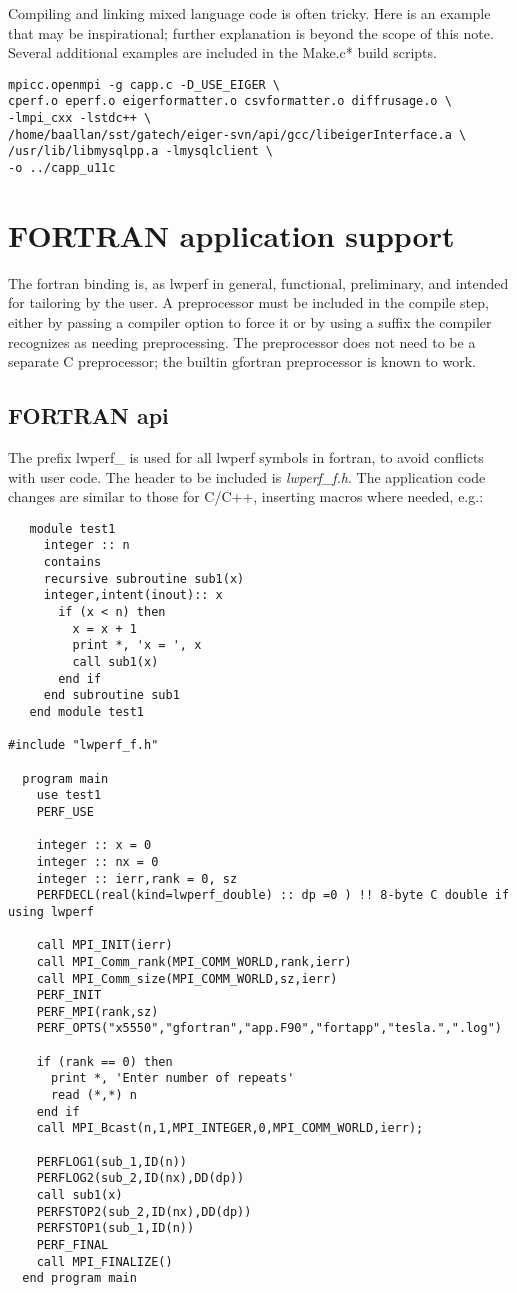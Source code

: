 \documentclass{article}
\begin{document}
Compiling and linking mixed language code is often tricky. Here is an example that may be inspirational; further explanation is beyond the scope of this note. Several additional examples are included in the Make.c* build scripts.
\begin{verbatim}
mpicc.openmpi -g capp.c -D_USE_EIGER \
cperf.o eperf.o eigerformatter.o csvformatter.o diffrusage.o \
-lmpi_cxx -lstdc++ \
/home/baallan/sst/gatech/eiger-svn/api/gcc/libeigerInterface.a \
/usr/lib/libmysqlpp.a -lmysqlclient \
-o ../capp_u11c
\end{verbatim}

\section{FORTRAN application support}
\label{sec:fortran}
The fortran binding is, as lwperf in general, functional, preliminary, and intended for tailoring by the user.  A preprocessor must be included in the compile step, either by passing a compiler option to force it or by using a suffix the compiler recognizes as needing preprocessing. The preprocessor does not need to be a separate C preprocessor; the builtin gfortran preprocessor is known to work.

\subsection{FORTRAN api}
\label{sec:fapi}
The prefix lwperf\_ is used for all lwperf symbols in fortran, to avoid conflicts with user code. The header to be included is {\em lwperf\_f.h}. 
The application code changes are similar to those for C/C++, inserting macros where needed, e.g.:
\begin{verbatim}
   module test1
     integer :: n
     contains
     recursive subroutine sub1(x)
     integer,intent(inout):: x
       if (x < n) then
         x = x + 1
         print *, 'x = ', x
         call sub1(x)
       end if
     end subroutine sub1
   end module test1

#include "lwperf_f.h"

  program main
    use test1
    PERF_USE

    integer :: x = 0
    integer :: nx = 0
    integer :: ierr,rank = 0, sz
    PERFDECL(real(kind=lwperf_double) :: dp =0 ) !! 8-byte C double if using lwperf

    call MPI_INIT(ierr)
    call MPI_Comm_rank(MPI_COMM_WORLD,rank,ierr)
    call MPI_Comm_size(MPI_COMM_WORLD,sz,ierr)
    PERF_INIT
    PERF_MPI(rank,sz)
    PERF_OPTS("x5550","gfortran","app.F90","fortapp","tesla.",".log") 

    if (rank == 0) then
      print *, 'Enter number of repeats'
      read (*,*) n
    end if
    call MPI_Bcast(n,1,MPI_INTEGER,0,MPI_COMM_WORLD,ierr);

    PERFLOG1(sub_1,ID(n)) 
    PERFLOG2(sub_2,ID(nx),DD(dp))
    call sub1(x)
    PERFSTOP2(sub_2,ID(nx),DD(dp))
    PERFSTOP1(sub_1,ID(n))
    PERF_FINAL
    call MPI_FINALIZE()
  end program main
\end{verbatim}
\end{document}
